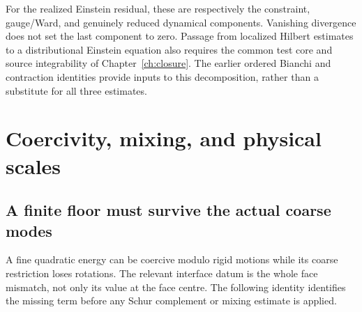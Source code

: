 \documentclass[11pt,a4paper,oneside]{book}
\theoremstyle{plain}
\theoremstyle{definition}
\theoremstyle{remark}
\newcommand{\src}[2]{\cite{#1}}
\begin{document}
For the realized Einstein residual, these are respectively the
constraint, gauge/Ward, and genuinely reduced dynamical components.
Vanishing divergence does not set the last component to zero.  Passage
from localized Hilbert estimates to a distributional Einstein equation
also requires the common test core and source integrability of
Chapter~\ref{ch:closure}.  The earlier ordered Bianchi and contraction
identities provide inputs to this decomposition, rather than a
substitute for all three estimates.\src{R13}{thm:v13v69-split,cor:v13v71-landing}



\chapter{Coercivity, mixing, and physical scales}
\label{ch:mixing}
\section{A finite floor must survive the actual coarse modes}
A fine quadratic energy can be coercive modulo rigid motions while its
coarse restriction loses rotations.  The relevant interface datum is the
whole face mismatch, not only its value at the face centre.  The following
identity identifies the missing term before any Schur complement or
mixing estimate is applied.
\end{document}
